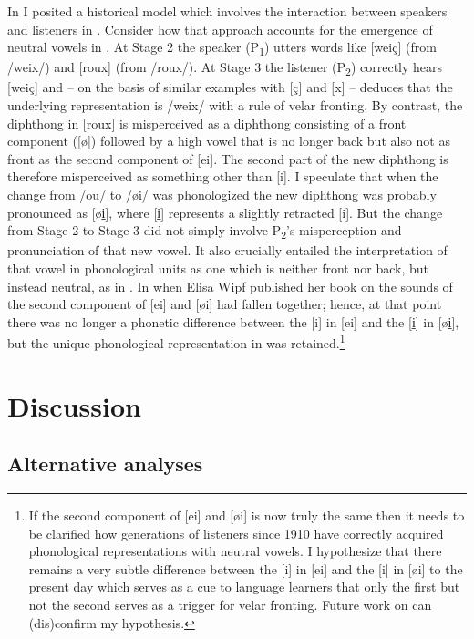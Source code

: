 In  I posited a historical model which involves the interaction between speakers and listeners in . Consider how that approach accounts for the emergence of neutral vowels in . At Stage 2 the speaker (P\textsubscript{1}) utters words like [weiç] (from /weix/) and [roux] (from /roux/). At Stage 3 the listener (P\textsubscript{2}) correctly hears [weiç] and -- on the basis of similar examples with [ç] and [x] -- deduces that the underlying representation is /weix/ with a rule of velar fronting. By contrast, the diphthong in [roux] is misperceived as a diphthong consisting of a front component ([ø]) followed by a high vowel that is no longer back but also not as front as the second component of [ei]. The second part of the new diphthong is therefore misperceived as something other than [i]. I speculate that when the change from /ou/ to /øi/ was phonologized the new diphthong was probably pronounced as [øi̠], where [i̠] represents a slightly retracted [i]. But the change from Stage 2 to Stage 3 did not simply involve P\textsubscript{2}’s misperception and pronunciation of that new vowel. It also crucially entailed the interpretation of that vowel in phonological units as one which is neither front nor back, but instead neutral, as in . In \citeyear{Wipf1910} when Elisa Wipf published her book on the sounds of  the second component of [ei] and [øi] had fallen together; hence, at that point there was no longer a phonetic difference between the [i] in [ei] and the [i̠] in [øi̠], but the unique phonological representation in  was retained.\footnote{{If the second component of [ei] and [øi] is now truly the same then it needs to be clarified how generations of  listeners since 1910 have correctly acquired phonological representations with neutral vowels. I hypothesize that there remains a very subtle difference between the [i] in [ei] and the [i] in [øi] to the present day which serves as a cue to language learners that only the first but not the second serves as a trigger for velar fronting. Future work on  can (dis)confirm my hypothesis.}}

\section{Discussion}\label{sec:6.5}\largerpage

\subsection{Alternative analyses}\label{sec:6.5.1}

